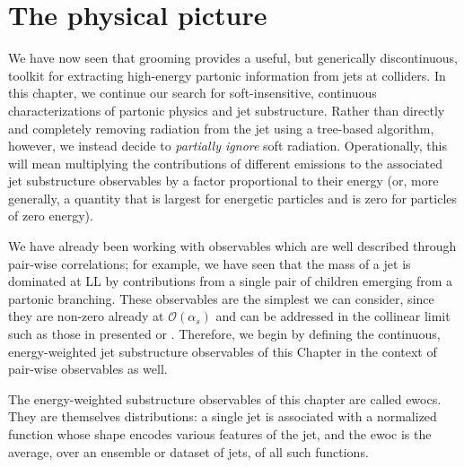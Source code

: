 \section{The physical picture}
\label{sec:ewoc-physical-picture}

We have now seen that grooming provides a useful, but generically discontinuous, toolkit for extracting high-energy partonic information from jets at colliders.
%
In this chapter, we continue our search for soft-insensitive, continuous characterizations of partonic physics and jet substructure.
%
Rather than directly and completely removing radiation from the jet using a tree-based algorithm, however, we instead decide to \textit{partially ignore} soft radiation.
%
Operationally, this will mean multiplying the contributions of different emissions to the associated jet substructure observables by a factor proportional to their energy (or, more generally, a quantity that is largest for energetic particles and is zero for particles of zero energy).

We have already been working with observables which are well described through pair-wise correlations;
%
for example, we have seen that the mass of a jet is dominated at LL by contributions from a single pair of children emerging from a partonic branching.
%
These observables are the simplest we can consider, since they are non-zero already at \(\mathcal{O}(\alpha_s)\) and can be addressed in the collinear limit such as those in presented  or .
%
Therefore, we begin by defining the continuous, energy-weighted jet substructure observables of this Chapter in the context of pair-wise observables as well.

The energy-weighted substructure observables of this chapter are called \glspl{ewoc}.
%
They are themselves distributions:
%
a single jet is associated with a normalized function whose shape encodes various features of the jet, and the \gls{ewoc} is the average, over an ensemble or dataset of jets, of all such functions.

